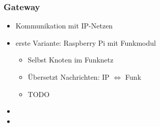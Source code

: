 \documentclass{beamer}
\begin{document}
\begin{frame}
    \frametitle{Gateway}

    \begin{itemize}
        \item Kommunikation mit IP-Netzen
        \item erste Variante: Raspberry Pi mit Funkmodul
            \begin{itemize}
                \item Selbst Knoten im Funknetz
                \item Übersetzt Nachrichten: IP $\Leftrightarrow$ Funk
                \item    TODO
            \end{itemize}
        \item
        \item
    \end{itemize}
\end{frame}

%
%
%

\nocite*
{}
\end{document}

